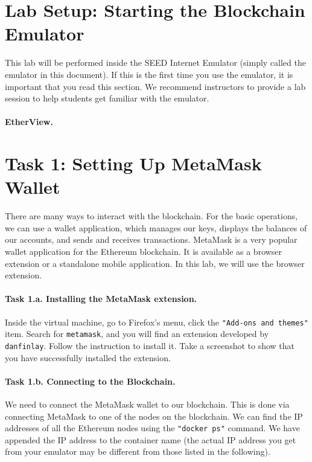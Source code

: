 \section{Lab Setup: Starting the Blockchain Emulator} 

This lab will be performed inside the SEED Internet Emulator (simply
called the emulator in this document). If this is the first time you
use the emulator, it is important that you read this section.
We recommend instructors to provide a lab session to
help students get familiar with the emulator.




\paragraph{EtherView.} 




\section{Task 1: Setting Up MetaMask Wallet} 

There are many ways to interact with the blockchain. 
For the basic operations, we can use a wallet application, which
manages our keys, displays the balances of our accounts, 
and sends and receives transactions.
MetaMask is a very popular wallet application for the 
Ethereum blockchain. It is available as a browser extension
or a standalone mobile application. 
In this lab, we will use the browser extension.


\paragraph{Task 1.a. Installing the MetaMask extension.} 
Inside the virtual machine, go to Firefox's menu, 
click the \texttt{"Add-ons and themes"}
item. Search for \texttt{metamask}, and you will find 
an extension developed by \texttt{danfinlay}. 
Follow the instruction to install it. Take a screenshot 
to show that you have successfully installed the 
extension. 


\paragraph{Task 1.b. Connecting to the Blockchain.} 
We need to connect the MetaMask wallet to our blockchain. 
This is done via connecting MetaMask to one of the 
nodes on the blockchain. We can find the IP addresses of all
the Ethereum nodes using the \texttt{"docker ps"} command. We have 
appended the IP address to the container name (the actual IP
address you get from your emulator may be different from
those listed in the following).

